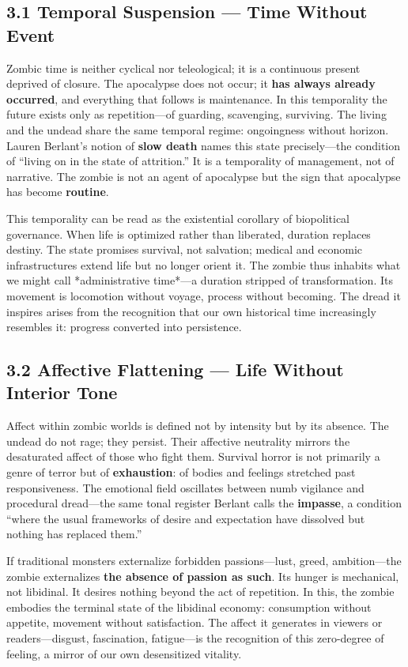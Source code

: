 \documentclass[11pt]{article}
\begin{document}
\subsection*{3.1 Temporal Suspension — Time Without Event}
\label{sec:orgcab603e}

Zombic time is neither cyclical nor teleological; it is a continuous present deprived of closure. The apocalypse does not occur; it \textbf{has always already occurred}, and everything that follows is maintenance. In this temporality the future exists only as repetition—of guarding, scavenging, surviving. The living and the undead share the same temporal regime: ongoingness without horizon. Lauren Berlant’s notion of \textbf{slow death} names this state precisely—the condition of “living on in the state of attrition.” It is a temporality of management, not of narrative. The zombie is not an agent of apocalypse but the sign that apocalypse has become \textbf{routine}.

This temporality can be read as the existential corollary of biopolitical governance. When life is optimized rather than liberated, duration replaces destiny. The state promises survival, not salvation; medical and economic infrastructures extend life but no longer orient it. The zombie thus inhabits what we might call *administrative time*—a duration stripped of transformation. Its movement is locomotion without voyage, process without becoming. The dread it inspires arises from the recognition that our own historical time increasingly resembles it: progress converted into persistence.
\subsection*{3.2 Affective Flattening — Life Without Interior Tone}
\label{sec:orge7b3b9c}

Affect within zombic worlds is defined not by intensity but by its absence. The undead do not rage; they persist. Their affective neutrality mirrors the desaturated affect of those who fight them. Survival horror is not primarily a genre of terror but of \textbf{exhaustion}: of bodies and feelings stretched past responsiveness. The emotional field oscillates between numb vigilance and procedural dread—the same tonal register Berlant calls the \textbf{impasse}, a condition “where the usual frameworks of desire and expectation have dissolved but nothing has replaced them.”

If traditional monsters externalize forbidden passions—lust, greed, ambition—the zombie externalizes \textbf{the absence of passion as such}. Its hunger is mechanical, not libidinal. It desires nothing beyond the act of repetition. In this, the zombie embodies the terminal state of the libidinal economy: consumption without appetite, movement without satisfaction. The affect it generates in viewers or readers—disgust, fascination, fatigue—is the recognition of this zero-degree of feeling, a mirror of our own desensitized vitality.
\end{document}

